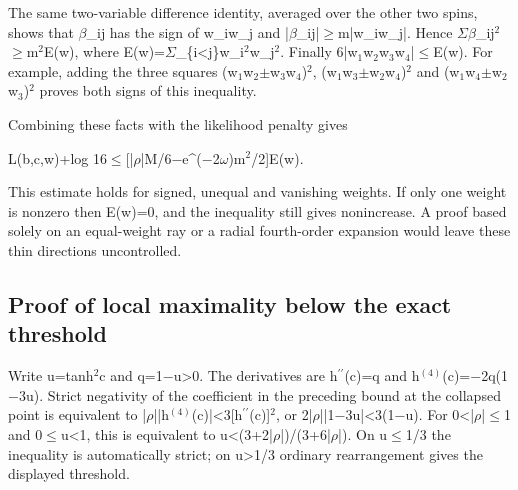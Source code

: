 \documentclass[11pt,a4paper]{article}
\begin{document}
The same two-variable difference identity, averaged over the other two spins, shows that \ensuremath{\beta}\_ij has the sign of w\_iw\_j and |\ensuremath{\beta}\_ij|\ensuremath{\geq}m|w\_iw\_j|. Hence \ensuremath{\Sigma}\ensuremath{\beta}\_ij\ensuremath{^2}\ensuremath{\geq}m\ensuremath{^2}E(w), where E(w)=\ensuremath{\Sigma}\_\{i<j\}w\_i\ensuremath{^2}w\_j\ensuremath{^2}. Finally 6|w\ensuremath{_1}w\ensuremath{_2}w\ensuremath{_3}w\ensuremath{_4}|\ensuremath{\leq}E(w). For example, adding the three squares (w\ensuremath{_1}w\ensuremath{_2}\ensuremath{\pm}w\ensuremath{_3}w\ensuremath{_4})\ensuremath{^2}, (w\ensuremath{_1}w\ensuremath{_3}\ensuremath{\pm}w\ensuremath{_2}w\ensuremath{_4})\ensuremath{^2} and (w\ensuremath{_1}w\ensuremath{_4}\ensuremath{\pm}w\ensuremath{_2}w\ensuremath{_3})\ensuremath{^2} proves both signs of this inequality.

Combining these facts with the likelihood penalty gives

L(b,c,w)+log 16\ensuremath{\leq}[|\ensuremath{\rho}|M/6\ensuremath{-}e\textasciicircum{}(\ensuremath{-}2\ensuremath{\omega})m\ensuremath{^2}/2]E(w).

This estimate holds for signed, unequal and vanishing weights. If only one weight is nonzero then E(w)=0, and the inequality still gives nonincrease. A proof based solely on an equal-weight ray or a radial fourth-order expansion would leave these thin directions uncontrolled.

\subsection{Proof of local maximality below the exact threshold}
Write u=tanh\ensuremath{^2}c and q=1\ensuremath{-}u>0. The derivatives are h\ensuremath{^{\prime\prime}}(c)=q and h\ensuremath{^{(4)}}(c)=\ensuremath{-}2q(1\ensuremath{-}3u). Strict negativity of the coefficient in the preceding bound at the collapsed point is equivalent to |\ensuremath{\rho}||h\ensuremath{^{(4)}}(c)|<3[h\ensuremath{^{\prime\prime}}(c)]\ensuremath{^2}, or 2|\ensuremath{\rho}||1\ensuremath{-}3u|<3(1\ensuremath{-}u). For 0<|\ensuremath{\rho}|\ensuremath{\leq}1 and 0\ensuremath{\leq}u<1, this is equivalent to u<(3+2|\ensuremath{\rho}|)/(3+6|\ensuremath{\rho}|). On u\ensuremath{\leq}1/3 the inequality is automatically strict; on u>1/3 ordinary rearrangement gives the displayed threshold.
\end{document}
